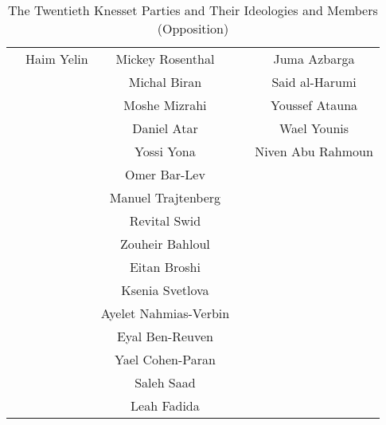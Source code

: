\begin{landscape}
\begin{table}
\begin{tabular}{|c|c|c|c|c|}
                            & Haim Yelin         & Mickey Rosenthal      &                & Juma Azbarga              \\
                            &                    & Michal Biran          &                & Said al-Harumi            \\
                            &                    & Moshe Mizrahi         &                & Youssef Atauna            \\
                            &                    & Daniel Atar           &                & Wael Younis               \\
                            &                    & Yossi Yona            &                & Niven Abu Rahmoun         \\
                            &                    & Omer Bar-Lev          &                &                           \\
                            &                    & Manuel Trajtenberg    &                &                           \\
                            &                    & Revital Swid          &                &                           \\
                            &                    & Zouheir Bahloul       &                &                           \\
                            &                    & Eitan Broshi          &                &                           \\
                            &                    & Ksenia Svetlova       &                &                           \\
                            &                    & Ayelet Nahmias-Verbin &                &                           \\
                            &                    & Eyal Ben-Reuven       &                &                           \\
                            &                    & Yael Cohen-Paran      &                &                           \\
                            &                    & Saleh Saad            &                &                           \\
                            &                    & Leah Fadida           &                &                           \\
  \hline
\end{tabular}
\caption{The Twentieth Knesset Parties and Their Ideologies and Members (Opposition)}
\label{table:knesset_party_members_opposition}
\end{table}
\normalsize
\end{landscape}

